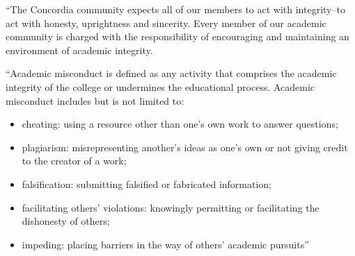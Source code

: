 \documentclass{tufte-handout}
\begin{document}

``The Concordia community expects all of our members to act with integrity--to act with honesty, uprightness and sincerity. Every member of our academic community is charged with the responsibility of encouraging and maintaining an environment of academic integrity.



``Academic misconduct is defined as any activity that comprises the academic integrity of the college or undermines the educational process. Academic misconduct includes but is not limited to:

\begin{itemize}
	\item cheating: using a resource other than one's own work to answer questions;
	\item plagiarism: misrepresenting another's ideas as one's own or not giving credit to the creator of a work;
	\item falsification: submitting falsified or fabricated information;
	\item facilitating others' violations: knowingly permitting or facilitating the dishonesty of others;
	\item impeding: placing barriers in the way of others' academic pursuits''
\end{itemize}
\end{document}
